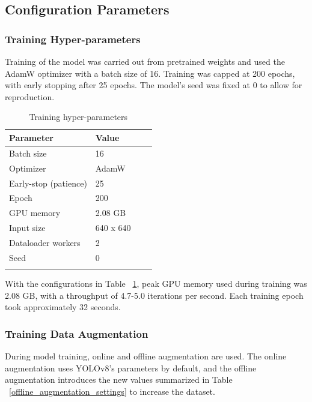 \documentclass[pdflatex,sn-mathphys-num]{sn-jnl}
\theoremstyle{thmstyleone}%
\theoremstyle{thmstyletwo}%
\theoremstyle{thmstylethree}%
\begin{document}
	\subsection{Configuration Parameters}\label{sec:config}
	\subsubsection{Training Hyper-parameters}\label{subsec:parameters}
	Training of the model was carried out from pretrained weights and used the AdamW optimizer with a batch size of 16. Training was capped at 200 epochs, with early stopping after 25 epochs. The model's seed was fixed at 0 to allow for reproduction.
	
	\begin{table}[h]
		\caption{Training hyper-parameters}\label{training_params}%
		\begin{tabular}{@{}llll@{}}
			\toprule
			Parameter & Value  \\
			\midrule
			Batch size    & 16  \\
			Optimizer    & AdamW  \\
			Early-stop (patience)   & 25  \\
			Epoch    & 200 \\
			GPU memory    & 2.08 GB  \\
			Input size   & 640 x 640  \\
			Dataloader workers    & 2  \\
			Seed    & 0  \\
			\botrule
		\end{tabular}
	\end{table}
	
	With the configurations in Table ~\ref{training_params}, peak GPU memory used during training was 2.08 GB, with a throughput of 4.7-5.0 iterations per second. Each training epoch took approximately 32 seconds.
	
	\subsubsection{Training Data Augmentation}\label{subsec:augmentation}
	During model training, online and offline augmentation are used. The online augmentation uses YOLOv8’s parameters by default, and the offline augmentation introduces the new values summarized in Table ~\ref{offline_augmentation_settings} to increase the dataset.
	
\end{document}
